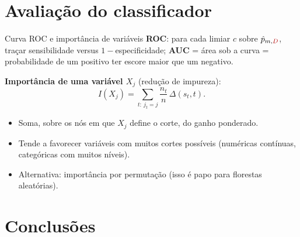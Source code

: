 \documentclass[aspectratio=169]{beamer}
\newcommand{\cD}{\textcolor{red!70!black}{D}}  %
\begin{document}
\section{Avaliação do classificador}


\begin{frame}{Curva ROC e importância de variáveis}
\textbf{ROC}: para cada limiar $c$ sobre $\hat p_{m,\cD}$, traçar sensibilidade versus $1-$especificidade; \textbf{AUC} = área sob a curva = probabilidade de um positivo ter escore maior que um negativo.

\vspace{8pt}
\textbf{Importância de uma variável $X_j$} (redução de impureza):
\[
I(X_j)=\sum_{t:\ j_t=j}\frac{n_t}{n}\,\Delta(s_t,t) .
\]
\begin{itemize}
  \item Soma, sobre os nós em que $X_j$ define o corte, do ganho ponderado.
  \item Tende a favorecer variáveis com muitos cortes possíveis (numéricas contínuas, categóricas com muitos níveis).
  \item Alternativa: importância por \alert{permutação} (isso é papo para florestas aleatórias).
\end{itemize}
\end{frame}







\section{Conclusões}
\end{document}
